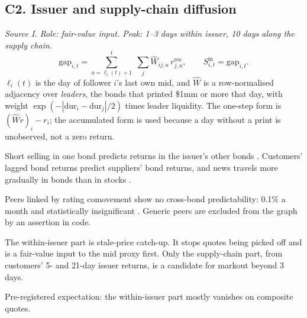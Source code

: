 \documentclass[11pt,letterpaper]{article}
\newcommand{\rres}{r^{\mathrm{res}}}      %
\begin{document}
\subsection{C2. Issuer and supply-chain diffusion}
\emph{Source I. Role: fair-value input. Peak: 1--3 days within issuer, 10 days along the supply chain.}
\begin{equation}
\mathrm{gap}_{i,t}=\sum_{u=\ell_i(t)+1}^{t}\;\sum_{j}\hat W_{ij,u}\,\rres_{j,u},\qquad S^{\mathrm{in}}_{i,t}=\mathrm{gap}_{i,t}.
\end{equation}
$\ell_i(t)$ is the day of follower $i$'s last own mid, and $\hat W$ is a row-normalised adjacency over \emph{leaders}, the bonds that printed \$1mm or more that day, with weight $\exp(-|\mathrm{dur}_i-\mathrm{dur}_j|/2)$ times leader liquidity. The one-step form is $(\hat W r)_i-r_i$; the accumulated form is used because a day without a print is unobserved, not a zero return.
\begin{spec}
\item[Mechanism and evidence.] Short selling in one bond predicts returns in the issuer's other bonds \cite{hkr2020}. Customers' lagged bond returns predict suppliers' bond returns, and news travels more gradually in bonds than in stocks \cite{supply2016}.
\item[Limit.] Peers linked by rating comovement show no cross-bond predictability: 0.1\% a month and statistically insignificant \cite{jfe2025}. Generic peers are excluded from the graph by an assertion in code.
\item[Role in the quote.] The within-issuer part is stale-price catch-up. It stops quotes being picked off and is a fair-value input to the mid proxy first. Only the supply-chain part, from customers' 5- and 21-day issuer returns, is a candidate for markout beyond 3 days.
\item[Decay and pitfalls.] Pre-registered expectation: the within-issuer part mostly vanishes on composite quotes.
\end{spec}
\end{document}
